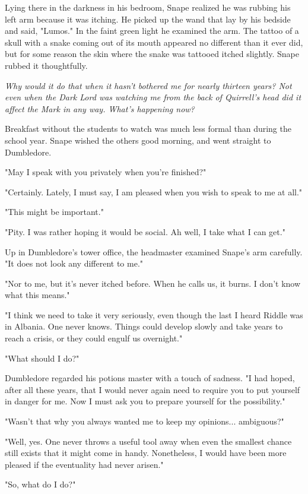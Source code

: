 Lying there in the darkness in his bedroom, Snape realized he was rubbing his left arm because it was itching. He picked up the wand that lay by his bedside and said, "Lumos." In the faint green light he examined the arm. The tattoo of a skull with a snake coming out of its mouth appeared no different than it ever did, but for some reason the skin where the snake was tattooed itched slightly. Snape rubbed it thoughtfully.

\emph{Why would it do that when it hasn't bothered me for nearly thirteen years? Not even when the Dark Lord was watching me from the back of Quirrell's head did it affect the Mark in any way. What's happening now?}

Breakfast without the students to watch was much less formal than during the school year. Snape wished the others good morning, and went straight to Dumbledore.

"May I speak with you privately when you're finished?"

"Certainly. Lately, I must say, I am pleased when you wish to speak to me at all."

"This might be important."

"Pity. I was rather hoping it would be social. Ah well, I take what I can get."

Up in Dumbledore's tower office, the headmaster examined Snape's arm carefully. "It does not look any different to me."

"Nor to me, but it's never itched before. When he calls us, it burns. I don't know what this means."

"I think we need to take it very seriously, even though the last I heard Riddle was in Albania. One never knows. Things could develop slowly and take years to reach a crisis, or they could engulf us overnight."

"What should I do?"

Dumbledore regarded his potions master with a touch of sadness. "I had hoped, after all these years, that I would never again need to require you to put yourself in danger for me. Now I must ask you to prepare yourself for the possibility."

"Wasn't that why you always wanted me to keep my opinions... ambiguous?"

"Well, yes. One never throws a useful tool away when even the smallest chance still exists that it might come in handy. Nonetheless, I would have been more pleased if the eventuality had never arisen."

"So, what do I do?"

